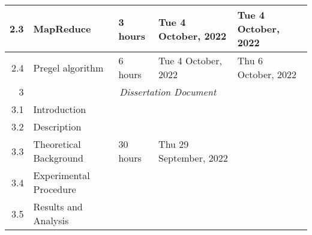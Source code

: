 \documentclass{standalone}
\begin{document}
\begin{tabular}{|r|llll|}
    2.3                                                       & \multicolumn{1}{l|}{MapReduce}                                  & \multicolumn{1}{l|}{3 hours}                                   & \multicolumn{1}{l|}{Tue 4 October, 2022}                    & Tue 4 October, 2022                                          \\ \hline
    2.4                                                       & \multicolumn{1}{l|}{Pregel algorithm}                           & \multicolumn{1}{l|}{6 hours}                                   & \multicolumn{1}{l|}{Tue 4 October, 2022}                    & Thu 6 October, 2022                                          \\ \hline
    3                                                         & \multicolumn{4}{c|}{\textit{Dissertation Document}}                                                                                                                                                                                                           \\ \hline
    3.1                                                       & \multicolumn{1}{l|}{Introduction}                               & \multicolumn{1}{l|}{}                                          & \multicolumn{1}{l|}{}                                       &                                                              \\ \hline
    3.2                                                       & \multicolumn{1}{l|}{Description}                                & \multicolumn{1}{l|}{}                                          & \multicolumn{1}{l|}{}                                       &                                                              \\ \hline
    3.3                                                       & \multicolumn{1}{l|}{Theoretical Background}                     & \multicolumn{1}{l|}{30 hours}                                  & \multicolumn{1}{l|}{Thu 29 September, 2022}                 &                                                              \\ \hline
    3.4                                                       & \multicolumn{1}{l|}{Experimental Procedure}                     & \multicolumn{1}{l|}{}                                          & \multicolumn{1}{l|}{}                                       &                                                              \\ \hline
    3.5                                                       & \multicolumn{1}{l|}{Results and Analysis}                       & \multicolumn{1}{l|}{}                                          & \multicolumn{1}{l|}{}                                       &                                                              \\ \hline

\end{tabular}
\end{document}
